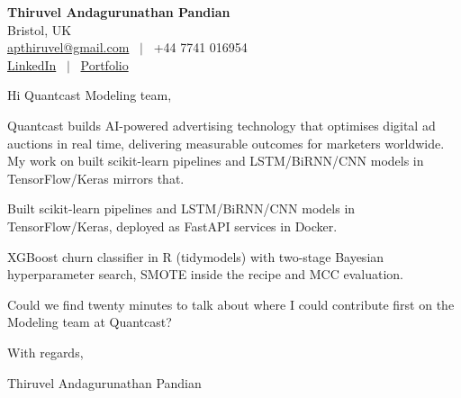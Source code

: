 \documentclass[11pt,a4paper]{article}
\begin{document}
\raggedright
\pagestyle{empty}

\begin{center}
    {\LARGE \color{linkblue} \textbf{Thiruvel Andagurunathan Pandian}}\\[0.2cm]
    Bristol, UK \\
    \href{mailto:apthiruvel@gmail.com}{apthiruvel@gmail.com} \ $|$ \ +44 7741 016954 \\
\href{https://www.linkedin.com/in/thiruvel-a-p/}{LinkedIn} \ $|$ \ \href{https://thiruvel-ap.github.io/PersonalPortfolio/}{Portfolio}
\end{center}

\vspace{0.4cm}

\noindent
Hi Quantcast Modeling team,

Quantcast builds AI-powered advertising technology that optimises digital ad auctions in real time, delivering measurable outcomes for marketers worldwide. My work on built scikit-learn pipelines and LSTM/BiRNN/CNN models in TensorFlow/Keras mirrors that.

Built scikit-learn pipelines and LSTM/BiRNN/CNN models in TensorFlow/Keras, deployed as FastAPI services in Docker.

XGBoost churn classifier in R (tidymodels) with two-stage Bayesian hyperparameter search, SMOTE inside the recipe and MCC evaluation.

Could we find twenty minutes to talk about where I could contribute first on the Modeling team at Quantcast?

\vspace{0.5cm}

With regards,

Thiruvel Andagurunathan Pandian
\end{document}
